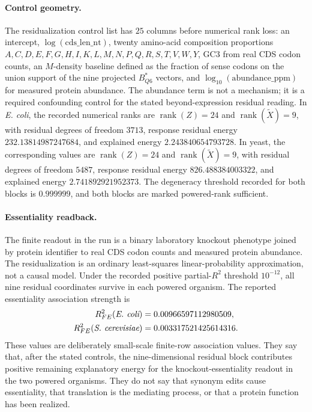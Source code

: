 \paragraph{Control geometry.}
The residualization control list has $25$ columns before numerical rank loss: an intercept, $\log(\mathrm{cds\_len\_nt})$, twenty amino-acid composition proportions $A,C,D,E,F,G,H,I,K,L,M,N,P,Q,R,S,T,V,W,Y$, GC3 from real CDS codon counts, an $M$-density baseline defined as the fraction of sense codons on the union support of the nine projected $B^{*}_{Q6}$ vectors, and $\log_{10}(\mathrm{abundance\_ppm})$ for measured protein abundance.  The abundance term is not a mechanism; it is a required confounding control for the stated beyond-expression residual reading.  In \emph{E. coli}, the recorded numerical ranks are $\operatorname{rank}(Z)=24$ and $\operatorname{rank}(\widetilde X)=9$, with residual degrees of freedom $3713$, response residual energy $232.13814987247684$, and explained energy $2.243840654793728$.  In yeast, the corresponding values are $\operatorname{rank}(Z)=24$ and $\operatorname{rank}(\widetilde X)=9$, with residual degrees of freedom $5487$, response residual energy $826.488384003322$, and explained energy $2.741892921952373$.  The degeneracy threshold recorded for both blocks is $0.999999$, and both blocks are marked powered-rank sufficient.

\paragraph{Essentiality readback.}
The finite readout in the run is a binary laboratory knockout phenotype joined by protein identifier to real CDS codon counts and measured protein abundance.  The residualization is an ordinary least-squares linear-probability approximation, not a causal model.  Under the recorded positive partial-$R^2$ threshold $10^{-12}$, all nine residual coordinates survive in each powered organism.  The reported essentiality association strength is
$$
\begin{aligned}
R^2_{FE}(\emph{E. coli})&=0.00966597112980509,\\
R^2_{FE}(\emph{S. cerevisiae})&=0.003317521425614316.
\end{aligned}
$$
These values are deliberately small-scale finite-row association values.  They say that, after the stated controls, the nine-dimensional residual block contributes positive remaining explanatory energy for the knockout-essentiality readout in the two powered organisms.  They do not say that synonym edits cause essentiality, that translation is the mediating process, or that a protein function has been realized.

